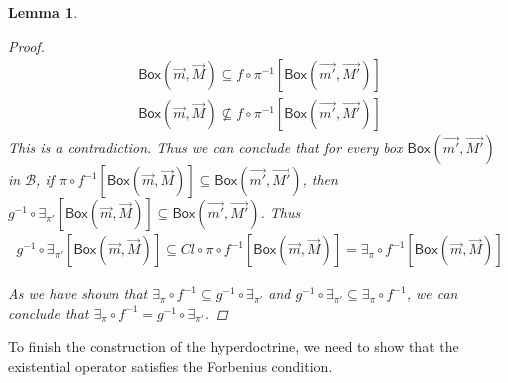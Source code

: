 \documentclass[12pt]{article}
\newtheorem{lemma}[theorem]{Lemma}
\newcommand{\bobject}{\mathsf{Box}}
\begin{document}
\begin{lemma}
\begin{proof}
\begin{gather*}
            \bobject(\vec{m},\vec{M})\subseteq f\circ\pi^{-1}[\bobject(\vec{m'},\vec{M'})]
            \\
           \bobject(\vec{m},\vec{M})\not\subseteq f\circ\pi^{-1}[\bobject(\vec{m'},\vec{M'})]
        \end{gather*}
        This is a contradiction. Thus
        we can conclude that for every
        box $\bobject(\vec{m'},\vec{M'})$ in $\mathcal{B}$,
        if $\pi\circ f^{-1}[\bobject(\vec{m},\vec{M})]\subseteq \bobject(\vec{m'},\vec{M'})$,
        then $g^{-1}\circ\exists_{\pi'}[\bobject(\vec{m},\vec{M})]\subseteq \bobject(\vec{m'},\vec{M'})$.
        Thus 
        \begin{gather*}
            g^{-1}\circ\exists_{\pi'}[\bobject(\vec{m},\vec{M})]
            \subseteq Cl\circ \pi\circ f^{-1}[\bobject(\vec{m},\vec{M})]=\exists_\pi\circ f^{-1}[\bobject(\vec{m},\vec{M})]
        \end{gather*}
        \par As we have shown that $\exists_\pi\circ f^{-1}\subseteq g^{-1}\circ\exists_{\pi'}$ and
        $g^{-1}\circ\exists_{\pi'}\subseteq \exists_\pi\circ f^{-1}$, we can conclude that
        $\exists_\pi\circ f^{-1}=g^{-1}\circ\exists_{\pi'}$.
    \end{proof}
\end{lemma}
To finish the construction of the hyperdoctrine, we need to show that the existential operator
satisfies the Forbenius condition.
\end{document}
